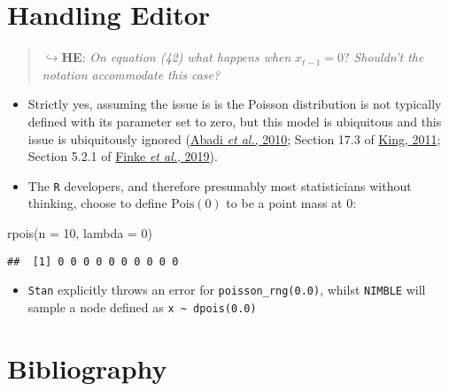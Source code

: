 \documentclass[
  10pt,
  a4paper,
]{article}
\newenvironment{Shaded}{\begin{snugshade}}{\end{snugshade}}
\newcommand{\AttributeTok}[1]{\textcolor[rgb]{0.77,0.63,0.00}{#1}}
\newcommand{\DecValTok}[1]{\textcolor[rgb]{0.00,0.00,0.81}{#1}}
\newcommand{\FunctionTok}[1]{\textcolor[rgb]{0.00,0.00,0.00}{#1}}
\newcommand{\NormalTok}[1]{#1}
\providecommand{\tightlist}{%
  \setlength{\itemsep}{0pt}\setlength{\parskip}{0pt}}
\begin{document}
\hypertarget{handling-editor}{%
\section*{Handling Editor}\label{handling-editor}}

\begin{quote}
\(\hookrightarrow\)\textbf{HE}: \emph{On equation (42) what happens
when} \(x_{t - 1} = 0\)? \emph{Shouldn't the notation accommodate this
case?}
\end{quote}

\begin{itemize}
\tightlist
\item
  Strictly yes, assuming the issue is is the Poisson distribution is not
  typically defined with its parameter set to zero, but this model is
  ubiquitous and this issue is ubiquitously ignored
  (\protect\hyperlink{ref-abadi_estimation_2010}{Abadi \emph{et al.},
  2010}; Section 17.3 of
  \protect\hyperlink{ref-king_statistical_2011}{King, 2011}; Section
  5.2.1 of \protect\hyperlink{ref-finke_efficient_2019}{Finke \emph{et
  al.}, 2019}).
\item
  The \texttt{R} developers, and therefore presumably most statisticians
  without thinking, choose to define \(\text{Pois}(0)\) to be a point
  mass at \(0\):
\end{itemize}

\begin{Shaded}
\begin{Highlighting}[]
\FunctionTok{rpois}\NormalTok{(}\AttributeTok{n =} \DecValTok{10}\NormalTok{, }\AttributeTok{lambda =} \DecValTok{0}\NormalTok{)}
\end{Highlighting}
\end{Shaded}

\begin{verbatim}
##  [1] 0 0 0 0 0 0 0 0 0 0
\end{verbatim}

\begin{itemize}
\tightlist
\item
  \texttt{Stan} explicitly throws an error for
  \texttt{poisson\_rng(0.0)}, whilst \texttt{NIMBLE} will sample a node
  defined as \texttt{x\ \textasciitilde{}\ dpois(0.0)}
\end{itemize}

\hypertarget{bibliography}{%
\section*{Bibliography}\label{bibliography}}
\end{document}
